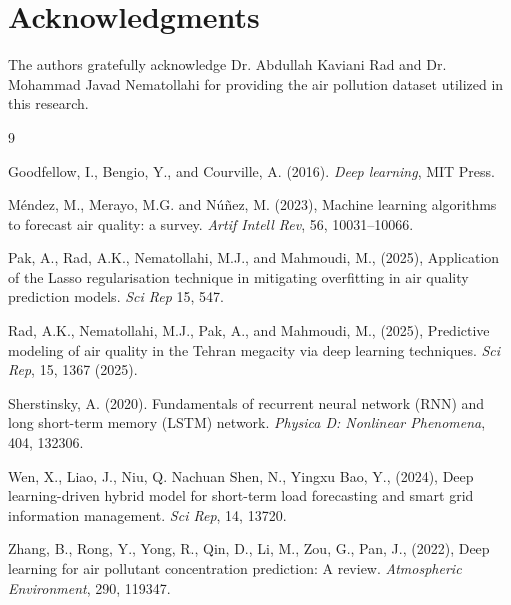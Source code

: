 \documentclass[twoside]{article}
\begin{document}

\section*{Acknowledgments}   
The authors gratefully acknowledge Dr. Abdullah Kaviani Rad and Dr. Mohammad Javad Nematollahi for providing the air pollution dataset utilized in this research. 

\begin{thebibliography}{9}



Goodfellow, I., Bengio, Y., and Courville, A. (2016). {\it Deep learning}, MIT Press.



Méndez, M., Merayo, M.G. and Núñez, M. (2023), Machine learning algorithms to forecast air quality: a survey. {\it Artif Intell Rev}, 56, 10031–10066.

Pak, A., Rad, A.K., Nematollahi, M.J., and Mahmoudi, M., (2025), Application of the Lasso regularisation technique in mitigating overfitting in air quality prediction models. {\it Sci Rep} 15, 547. 

Rad, A.K., Nematollahi, M.J., Pak, A., and Mahmoudi, M., (2025), Predictive modeling of air quality in the Tehran megacity via deep learning techniques. {\it Sci Rep}, 15, 1367 (2025).

Sherstinsky, A. (2020). Fundamentals of recurrent neural network (RNN) and long short-term memory (LSTM) network. {\it Physica D: Nonlinear Phenomena}, 404, 132306.


Wen, X., Liao, J., Niu, Q.  Nachuan Shen, N., Yingxu Bao, Y., (2024), Deep learning-driven hybrid model for short-term load forecasting and smart grid information management. {\it Sci Rep}, 14, 13720.

Zhang, B., Rong, Y., Yong, R., Qin, D.,  Li, M., Zou, G., Pan, J., (2022), Deep learning for air pollutant concentration prediction: A review. {\it Atmospheric Environment}, 290, 119347.





\end{thebibliography}
 
\end{document}
